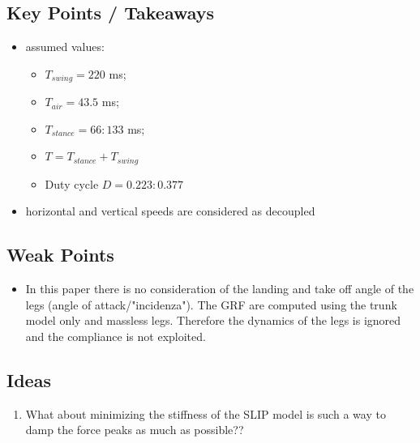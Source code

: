 \subsection*{Key Points / Takeaways}
\begin{itemize}
\item assumed values:
\begin{itemize}
\item $T_{swing} = 220$ ms;
\item $T_{air} = 43.5$ ms;
\item $T_{stance} = 66:133$ ms;
\item $T = T_{stance} + T_{swing}$
\item Duty cycle $D = 0.223:0.377$
\end{itemize}
\item horizontal and vertical speeds are considered as decoupled
\end{itemize}


\subsection*{Weak Points}

\begin{itemize}
\item In this paper there is no consideration of the landing and take off angle of the legs (angle of attack/"incidenza"). The GRF are computed using the trunk model only and massless legs. Therefore the dynamics of the legs is ignored and the compliance is not exploited.
\end{itemize}
\subsection*{Ideas} 
\begin{enumerate}
\item What about minimizing the stiffness of the SLIP model is such a way to damp the force peaks as much as possible??
\end{enumerate}
